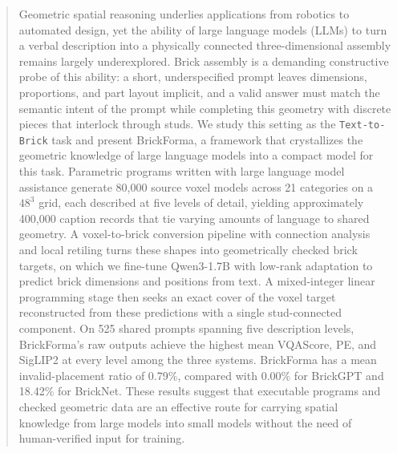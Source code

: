 \begin{abstract}
Geometric spatial reasoning underlies applications from robotics to automated design, yet the ability of large language models (LLMs) to turn a verbal description into a physically connected three-dimensional assembly remains largely underexplored. Brick assembly is a demanding constructive probe of this ability: a short, underspecified prompt leaves dimensions, proportions, and part layout implicit, and a valid answer must match the semantic intent of the prompt while completing this geometry with discrete pieces that interlock through studs. We study this setting as the \texttt{Text-to-Brick} task and present BrickForma, a framework that crystallizes the geometric knowledge of large language models into a compact model for this task. Parametric programs written with large language model assistance generate 80,000 source voxel models across 21 categories on a $48^3$ grid, each described at five levels of detail, yielding approximately 400,000 caption records that tie varying amounts of language to shared geometry. A voxel-to-brick conversion pipeline with connection analysis and local retiling turns these shapes into geometrically checked brick targets, on which we fine-tune Qwen3-1.7B with low-rank adaptation to predict brick dimensions and positions from text. A mixed-integer linear programming stage then seeks an exact cover of the voxel target reconstructed from these predictions with a single stud-connected component. On 525 shared prompts spanning five description levels, BrickForma's raw outputs achieve the highest mean VQAScore, PE, and SigLIP2 at every level among the three systems. BrickForma has a mean invalid-placement ratio of 0.79\%, compared with 0.00\% for BrickGPT and 18.42\% for BrickNet. These results suggest that executable programs and checked geometric data are an effective route for carrying spatial knowledge from large models into small models without the need of human-verified input for training.
\end{abstract}